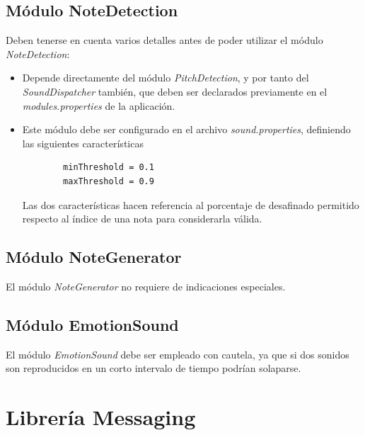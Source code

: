 \subsection{Módulo NoteDetection}
\label{manual:notedetection}

Deben tenerse en cuenta varios detalles antes de poder utilizar el módulo \textit{NoteDetection}:
\begin{itemize}
	\item Depende directamente del módulo \textit{PitchDetection}, y por tanto del \textit{SoundDispatcher} también, que deben ser declarados previamente en el \textit{modules.properties} de la aplicación.
	\item Este módulo debe ser configurado en el archivo \textit{sound.properties}, definiendo las siguientes características	\begin{verbatim}
		minThreshold = 0.1
		maxThreshold = 0.9
	\end{verbatim}
	Las dos características hacen referencia al porcentaje de desafinado permitido respecto al índice de una nota para considerarla válida.
\end{itemize}


\subsection{Módulo NoteGenerator}
\label{manual:notegenerator}

El módulo \textit{NoteGenerator} no requiere de indicaciones especiales.
\label{manual:emotionsound}
\subsection{Módulo EmotionSound}

El módulo \textit{EmotionSound} debe ser empleado con cautela, ya que si dos sonidos son reproducidos en un corto intervalo de tiempo podrían solaparse.


\section{Librería Messaging}
